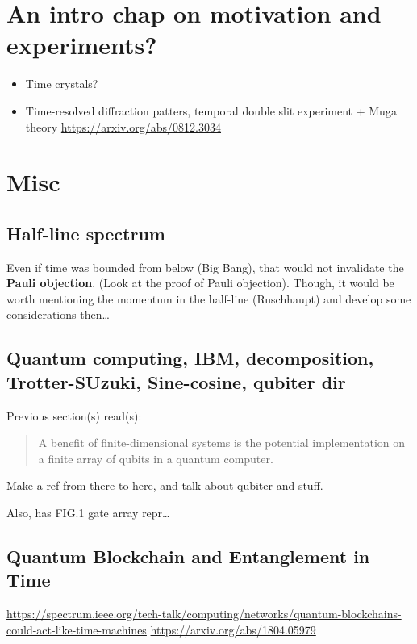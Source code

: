 \section{An intro chap on motivation and experiments?}
\begin{itemize}
  \item Time crystals?
  \item Time-resolved diffraction patters, temporal double slit experiment + Muga theory \url{https://arxiv.org/abs/0812.3034}
\end{itemize}


\section{Misc}


\subsection{Half-line spectrum}
Even if time was bounded from below (Big Bang), that would not invalidate the \textbf{Pauli objection}.
(Look at the proof of Pauli objection).
Though, it would be worth mentioning the momentum in the half-line (Ruschhaupt)
and develop some considerations then\dots


\subsection{Quantum computing, IBM, decomposition, Trotter-SUzuki, Sine-cosine, qubiter dir}

Previous section(s) read(s):
\begin{quote}
  A benefit of finite-dimensional systems is the potential implementation on a finite array of
  qubits in a quantum computer.
\end{quote}
Make a ref from there to here, and talk about qubiter and stuff.

Also, \cite{Moreva:illustration} has FIG.1 gate array repr\dots

\subsection{Quantum Blockchain and Entanglement in Time}

\url{https://spectrum.ieee.org/tech-talk/computing/networks/quantum-blockchains-could-act-like-time-machines}
\url{https://arxiv.org/abs/1804.05979}


